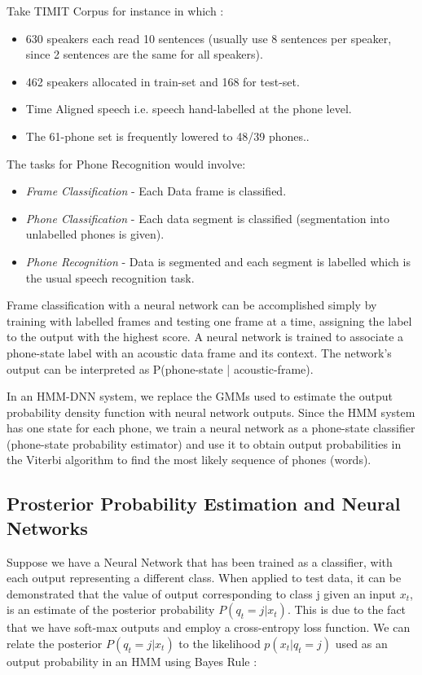 Take TIMIT Corpus for instance in which \cite{garofolo_john_s_timit_1993}:
\begin{itemize}
    \item 630 speakers each read 10 sentences (usually use 8 sentences per speaker, since 2 sentences are the same for all speakers).
    \item 462 speakers allocated in train-set and 168 for test-set.
    \item Time Aligned speech i.e. speech hand-labelled at the phone level. 
    \item The 61-phone set is frequently lowered to 48/39 phones..
\end{itemize}

The tasks for Phone Recognition would involve: 
\begin{itemize}
    \item \textit{Frame Classification} - Each Data frame is classified.
    \item \textit{Phone Classification} - Each data segment is classified (segmentation into unlabelled phones is given).
    \item \textit{Phone Recognition} - Data is segmented and each segment is labelled which is the usual speech recognition task.
\end{itemize}

Frame classification with a neural network can be accomplished simply by training with labelled frames and testing one frame at a time, assigning the label to the output with the highest score. A neural network is trained to associate a phone-state label with an acoustic data frame and its context. The network's output can be interpreted as P(phone-state | acoustic-frame).

In an HMM-DNN system, we replace the GMMs used to estimate the output probability density function with neural network outputs. Since the HMM system has one state for each phone, we train a neural network as a phone-state classifier (phone-state probability estimator) and use it to obtain output probabilities in the Viterbi algorithm to find the most likely sequence of phones (words).

\subsection{Prosterior Probability Estimation and Neural Networks} 
Suppose we have a Neural Network that has been trained as a classifier, with each output representing a different class. When applied to test data, it can be demonstrated that the value of output corresponding to class j given an input  $x_{t}$, is an estimate of the posterior probability $P(q_{t} = j |x_{t} )$. This is due to the fact that we have soft-max outputs and employ a cross-entropy loss function. We can relate the posterior $P(q_{t} = j | x_{t})$ to the likelihood $p(x_{t} |q_{t} = j)$ used as an output probability in an HMM using Bayes Rule :


